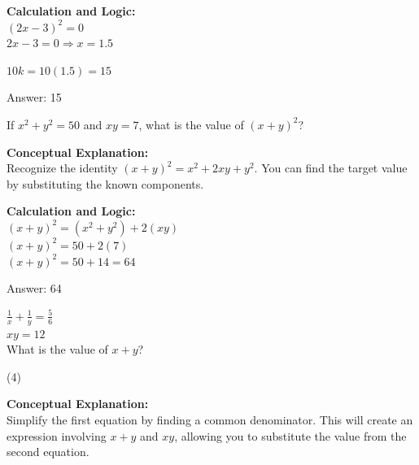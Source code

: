 \documentclass[11pt,paper=a4,answers]{exam}
\begin{document}
\begin{questions}
\begin{solution}
\vspace{20pt}

\textbf{Calculation and Logic:} \\
$(2x - 3)^2 = 0$ \\
$2x - 3 = 0 \Rightarrow x = 1.5$

\vspace{10pt}

$10k = 10(1.5) = 15$

\vspace{25pt}

Answer: \colorbox{yellow!100}{15}
\end{solution}

\vspace{40pt}

\question
If $x^2 + y^2 = 50$ and $xy = 7$, what is the value of $(x + y)^2$?

\begin{solution}
\textbf{Conceptual Explanation:} \\
Recognize the identity $(x + y)^2 = x^2 + 2xy + y^2$. You can find the target value by substituting the known components.

\vspace{20pt}

\textbf{Calculation and Logic:} \\
$(x + y)^2 = (x^2 + y^2) + 2(xy)$ \\
$(x + y)^2 = 50 + 2(7)$ \\
$(x + y)^2 = 50 + 14 = 64$

\vspace{25pt}

Answer: \colorbox{yellow!100}{64}
\end{solution}

\vspace{40pt}

\question
$\frac{1}{x} + \frac{1}{y} = \frac{5}{6}$ \\
$xy = 12$ \\
What is the value of $x + y$?
\begin{tasks}(4)
\end{tasks}

\begin{solution}
\textbf{Conceptual Explanation:} \\
Simplify the first equation by finding a common denominator. This will create an expression involving $x+y$ and $xy$, allowing you to substitute the value from the second equation.


\end{solution}
\end{questions}
\end{document}
